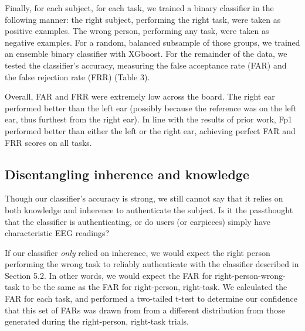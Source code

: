 \documentclass[11pt]{article}
\begin{document}
Finally, for each subject, for each task, we trained a binary classifier 
in the following manner: the right subject, performing the right task, were taken
as positive examples. The wrong person, performing any task, were taken as negative
examples. For a random, balanced subsample of those groups, we trained an ensemble
binary classifier with XGboost. For the remainder of the data, we tested the 
classifier's accuracy, measuring the false acceptance rate (FAR) and the false
rejection rate (FRR) (Table 3).

Overall, FAR and FRR were extremely low across the board. The right ear 
performed better than the left ear (possibly because the reference was on
the left ear, thus furthest from the right ear). In line with the 
results of prior work, Fp1 performed better than either the left or the right ear,
achieving perfect FAR and FRR scores on all tasks.

\subsection{Disentangling inherence and knowledge}
\label{sec:orga057897}

Though our classifier's accuracy is strong, we still cannot say that it relies 
on both knowledge and inherence to authenticate the subject. Is it the passthought
that the classifier is authenticating, or do users (or earpieces) simply have characteristic
EEG readings? 

If our classifier \emph{only} relied on inherence, we would expect the right person performing
the wrong task to reliably authenticate with the classifier described in Section 5.2.
In other words, we would expect the FAR for right-person-wrong-task to be the same 
as the FAR for right-person, right-task. We calculated the FAR for each task, and performed
a two-tailed t-test to determine our confidence that this set of FARs was drawn from
from a different distribution from those generated during the right-person, right-task trials.
\end{document}
